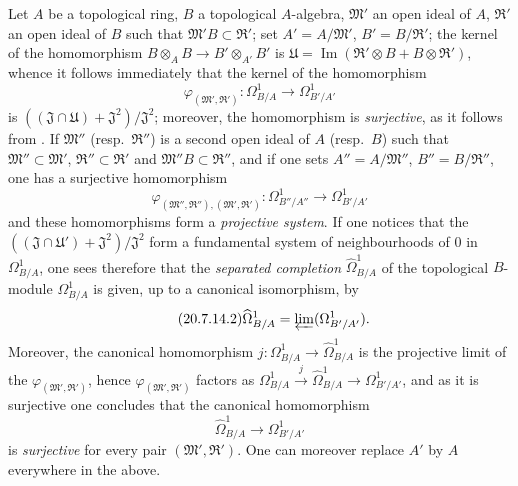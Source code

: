 \begin{env}[20.7.14]
\label{0.20.7.14}
Let $A$ be a topological ring, $B$ a topological $A$-algebra, $\mathfrak{M}'$ an open ideal of $A$, $\mathfrak{R}'$ an open ideal of $B$ such that $\mathfrak{M}'B\subset\mathfrak{R}'$; set $A'=A/\mathfrak{M}'$, $B'=B/\mathfrak{R}'$;
the kernel of the homomorphism $B\otimes_A B\to B'\otimes_{A'} B'$ is $\mathfrak{U}=\operatorname{Im}(\mathfrak{R}'\otimes B+B\otimes\mathfrak{R}')$, whence it follows immediately that the kernel of the homomorphism
\begin{equation}
\tag{20.7.14.1}
  \label{0.20.7.14.1}
  \varphi_{(\mathfrak{M}',\mathfrak{R}')}:\Omega^1_{B/A}\to\Omega^1_{B'/A'}
\end{equation}
is $((\mathfrak{J}\cap\mathfrak{U})+\mathfrak{J}^2)/\mathfrak{J}^2$; moreover, the homomorphism  is \emph{surjective}, as it follows from .
If $\mathfrak{M}''$ (resp.\ $\mathfrak{R}''$) is a second open ideal of $A$ (resp.\ $B$) such that $\mathfrak{M}''\subset\mathfrak{M}'$, $\mathfrak{R}''\subset\mathfrak{R}'$ and $\mathfrak{M}''B\subset\mathfrak{R}''$, and if one sets $A''=A/\mathfrak{M}''$, $B''=B/\mathfrak{R}''$, one has a surjective homomorphism
\[
  \varphi_{(\mathfrak{M}'',\mathfrak{R}''),({\mathfrak{M}',\mathfrak{R}'})}:\Omega^1_{B''/A''}\to\Omega^1_{B'/A'}
\]
and these homomorphisms form a \emph{projective system}.
If one notices that the $((\mathfrak{J}\cap\mathfrak{U}')+\mathfrak{J}^2)/\mathfrak{J}^2$ form a fundamental system of neighbourhoods of $0$ in $\Omega^1_{B/A}$, one sees therefore that the \emph{separated completion} $\widehat{\Omega}^1_{B/A}$ of the topological $B$-module $\Omega^1_{B/A}$ is given, up to a canonical isomorphism, by
\begin{equation}
\tag{20.7.14.2}
  \label{0.20.7.14.2}
  \widehat{\Omega}^1_{B/A}=\varprojlim(\Omega^1_{B'/A'}).
\end{equation}
Moreover, the canonical homomorphism $j:\Omega^1_{B/A}\to\widehat{\Omega}^1_{B/A}$ is the projective limit of the $\varphi_{(\mathfrak{M}',\mathfrak{R}')}$, hence $\varphi_{(\mathfrak{M}',\mathfrak{R}')}$ factors as $\Omega^1_{B/A}\xrightarrow{j}\widehat{\Omega}^1_{B/A}\to\Omega^1_{B'/A'}$, and as it is surjective one concludes that the canonical homomorphism
\begin{equation}
\tag{20.7.14.3}
  \label{0.20.7.14.3}
  \widehat{\Omega}^1_{B/A}\to\Omega^1_{B'/A'}
\end{equation}
is \emph{surjective} for every pair $(\mathfrak{M}',\mathfrak{R}')$.
One can moreover replace $A'$ by $A$ everywhere in the above.


\end{env}
